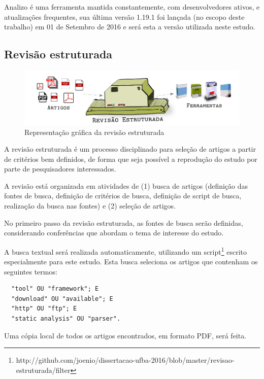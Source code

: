 Analizo é uma ferramenta mantida constantemente, com desenvolvedores ativos, e
atualizações frequentes, sua última versão 1.19.1 foi lançada (no escopo deste
trabalho) em 01 de Setembro de 2016 e será esta a versão utilizada neste
estudo.

\subsection{Revisão estruturada} \label{revisao-estruturada}

\begin{figure}[h]
  \center
  \includegraphics[scale=0.33]{imagens/revisao-estruturada.png}
  \caption{Representação gráfica da revisão estruturada}
  \label{figura-revisao-estruturada}
\end{figure}

A revisão estruturada é um processo disciplinado para seleção de artigos a
partir de critérios bem definidos, de forma que seja possível a reprodução do
estudo por parte de pesquisadores interessados.

A revisão está organizada em atividades de (1) busca de artigos (definição
das fontes de busca, definição de critérios de busca, definição de script de
busca, realização da busca nas fontes) e (2) seleção de artigos. 

No primeiro passo da revisão estruturada, as fontes de busca serão definidas,
considerando conferências que abordam o tema de interesse do estudo. 

A busca textual será realizada automaticamente, utilizando um
script\footnote{http://github.com/joenio/dissertacao-ufba-2016/blob/master/revisao-estruturada/filter}
escrito especialmente para este estudo. Esta busca seleciona os artigos que
contenham os seguintes termos:

\begin{verbatim}
  "tool" OU "framework"; E
  "download" OU "available"; E
  "http" OU "ftp"; E
  "static analysis" OU "parser".
\end{verbatim}

Uma cópia local de todos os artigos encontrados, em formato PDF, será feita.

